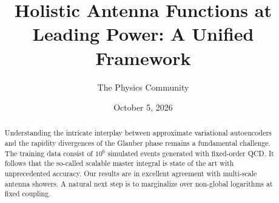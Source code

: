 \documentclass[11pt]{article}
\title{Holistic Antenna Functions at Leading Power: A Unified Framework}
\author{The Physics Community}
\date{October 5, 2026}
\numberwithin{equation}{section}
\theoremstyle{definition}
\theoremstyle{remark}
\begin{document}
\maketitle
\begin{abstract}
Understanding the intricate interplay between approximate variational
autoencoders and the rapidity divergences of the Glauber phase remains a
fundamental challenge. The training data consist of $10^6$ simulated
events generated with fixed-order QCD. It follows that the so-called
scalable master integral is state of the art with unprecedented
accuracy. Our results are in excellent agreement with multi-scale
antenna showers. A natural next step is to marginalize over non-global
logarithms at fixed coupling.
\end{abstract}
\tableofcontents



\nocite{*}


\end{document}
